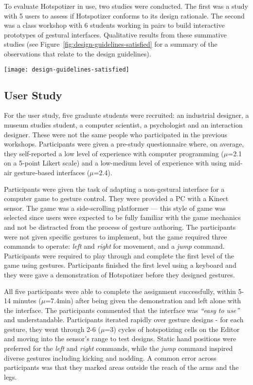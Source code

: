 To evaluate Hotspotizer in use, two studies were conducted. The first was a study with 5 users to assess if Hotspotizer conforms to its design rationale. The second was a class workshop with 6 students working in pairs to build interactive prototypes of gestural interfaces. Qualitative results from these summative studies  (see Figure~\ref{fig:design-guidelines-satisfied} for a summary of the observations that relate to the design guidelines).

\begin{SCfigure}[\sidecaptionrelwidth][ht]
\centering
\texttt{[image: design-guidelines-satisfied]}
\caption{Qualitative findings from two studies affirm that Hotspotizer is in keeping with our design rationale.}
\label{fig:design-guidelines-satisfied}
\end{SCfigure}

\subsection{User Study}

For the user study, five graduate students were recruited: an industrial designer, a museum studies student, a computer scientist, a psychologist and an interaction designer. These were not the same people who participated in the previous workshops. Participants were given a pre-study questionnaire where, on average, they self-reported a low level of experience with computer programming ($\mu$=2.1 on a 5-point Likert scale) and a low-medium level of experience with using mid-air gesture-based interfaces ($\mu$=2.4).

Participants were given the task of adapting a non-gestural interface for a computer game to gesture control. They were provided a PC with a Kinect sensor. The game was a side-scrolling platformer --- this style of game was selected since users were expected to be fully familiar with the game mechanics and not be distracted from the process of gesture authoring. The participants were not given specific gestures to implement, but the game required three commands to operate: \emph{left} and \emph{right} for movement, and a \emph{jump} command. Participants were required to play through and complete the first level of the game using gestures. Participants finished the first level using a keyboard and they were gave a demonstration of Hotspotizer before they designed gestures.

All five participants were able to complete the assignment successfully, within 5-14 minutes ($\mu$=7.4min) after being given the demonstration and left alone with the interface. The participants commented that the interface was \emph{“easy to use”} and understandable. Participants iterated rapidly over gesture designs - for each gesture, they went through 2-6 ($\mu$=3) cycles of hotspotizing cells on the Editor and moving into the sensor’s range to test designs. Static hand positions were preferred for the \emph{left} and \emph{right} commands, while the \emph{jump} command inspired diverse gestures including kicking and nodding. A common error across participants was that they marked areas outside the reach of the arms and the legs.

